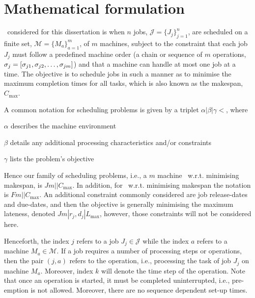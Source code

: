 \section{Mathematical formulation}
\Jsp\ considered for this dissertation is when $n$ jobs, 
$\mathcal{J}=\{J_j\}_{j=1}^n$, are scheduled on a finite set, 
$\mathcal{M}=\{M_a\}_{a=1}^m$, of $m$ machines, subject to the constraint that 
each job $J_j$ must follow a predefined machine order (a chain or sequence of 
$m$ operations, ${\mathbf{\sigma}}_j=[\sigma_{j1},\sigma_{j2},\dotsc,\sigma_{jm}]$) and 
that a machine can handle at most one job at a time. 
The objective is to schedule jobs in such a manner as to minimise the maximum 
completion times for all tasks, which is also known as the makespan, 
$C_{\max}$. 

A common notation for scheduling problems \citep[cf. Chapter 2 in ][]{Pinedo08} 
is given by a triplet $\alpha|\beta|\gamma<$, where 
\begin{enumerate*}[itemjoin*={, and finally}, label={{}}]
  \item $\alpha$ describes the machine environment
  \item $\beta$ details any additional processing characteristics and/or 
  constraints
  \item $\gamma$ lists the problem's objective
\end{enumerate*}
Hence our family of scheduling problems, i.e., a $m$ machine \JSP\ w.r.t. 
minimising makespan, is $Jm||C_{\max}$. 
In addition, for \FSP\ w.r.t. minimising makespan the notation is 
$Fm||C_{\max}$. 
An additional constraint commonly considered are job release-dates and 
due-dates, and then the objective is generally minimising the maximum lateness, 
denoted $Jm|r_j,d_j|L_{\max}$, however, those  constraints will not be 
considered here. 

Henceforth, the index $j$ refers to a job $J_j\in\mathcal{J}$ while the index 
$a$ refers to a machine $M_a\in\mathcal{M}$. If a job requires a number of 
processing steps or operations, then the pair $(j,a)$ refers to the operation, 
i.e., processing the task of job $J_j$ on machine $M_a$. Moreover, index $k$ 
will denote the time step of the operation. Note that once an operation is 
started, it must be completed uninterrupted, i.e., pre-emption is not allowed. 
Moreover, there are no sequence dependent set-up times.

